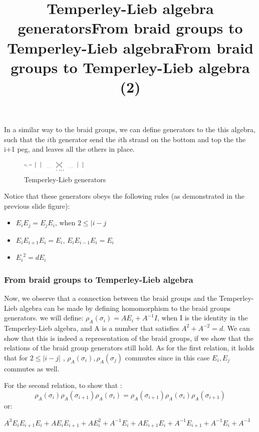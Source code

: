 \documentclass{article}
\begin{document}
\title{Temperley-Lieb algebra generators}
In a similar way to the braid groups, we can define generators to the this algebra, 
such that the $i$th generator send the $i$th strand on the bottom and top the the i+1 peg, 
and leaves all the others in place.
\begin{figure}
\includegraphics[scale=0.5]{tempely_lieb_generators} 
\caption{Temperley-Lieb generators}


\end{figure}
Notice that these generators obeys the following rules (as demonstrated in the previous slide figure):
\begin{itemize}
\item $E_{i}E_{j} = E_{j}E_{i}$, when $2 \leq |i-j$
\item $E_{i}E_{i+1}E_{i} = E_{i}$, $E_{i}E_{i-1}E_{i} = E_{i}$
\item ${E_{i}}^2 = dE_{i}$
\end{itemize}


\subsubsection{From braid groups to Temperley-Lieb algebra }
\title{From braid groups to Temperley-Lieb algebra}
Now, we observe that a connection between the braid groups and the Temperley-Lieb algebra can
be made by defining homomorphism to the braid groups generators. we will define:
$\rho_{A}(\sigma_{i}) = AE_{i} +A^{-1}I$, when I is the identity in the Temperley-Lieb algebra,
and A is a number that satisfies $A^{2}+A^{-2}=d$.
We can show that this is indeed a representation of the braid groups, if we show that the relations
of the braid group generators still hold.
As for the first relation, it holds that for $2 \leq |i-j|$ , $\rho_{A}(\sigma_{i}),\rho_{A}(\sigma_{j})$ commutes since in this case $E_{i},E_{j}$ commutes as well.

\title{From braid groups to Temperley-Lieb algebra (2)}
For the second relation, to show that :
\begin{displaymath}
\rho_{A}(\sigma_{i})\rho_{A}(\sigma_{i+1})\rho_{A}(\sigma_{i})= \rho_{A}(\sigma_{i+1})\rho_{A}(\sigma_{i})\rho_{A}(\sigma_{i+1})
\end{displaymath}
or:

$
A^{3}E_{i}E_{i+1}E_{i} +AE_{i}E_{i+1} + AE_{i}^{2} + A^{-1}E_{i} +AE_{i+1}E_{i}+A^{-1}E_{i+1} + A^{-1}E_{i} + A^{-3}$
\end{document}

